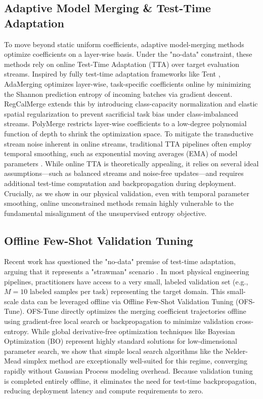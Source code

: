 \subsection{Adaptive Model Merging \& Test-Time Adaptation}
To move beyond static uniform coefficients, adaptive model-merging methods optimize coefficients on a layer-wise basis.
Under the "no-data" constraint, these methods rely on online Test-Time Adaptation (TTA) over target evaluation streams.
Inspired by fully test-time adaptation frameworks like Tent \cite{wang2020tent,liang2023source}, AdaMerging \cite{adamerging} optimizes layer-wise, task-specific coefficients online by minimizing the Shannon prediction entropy of incoming batches via gradient descent.
RegCalMerge \cite{regcalmerge} extends this by introducing class-capacity normalization and elastic spatial regularization to prevent sacrificial task bias under class-imbalanced streams.
PolyMerge \cite{polymerge} restricts layer-wise coefficients to a low-degree polynomial function of depth to shrink the optimization space.
To mitigate the transductive stream noise inherent in online streams, traditional TTA pipelines often employ temporal smoothing, such as exponential moving averages (EMA) of model parameters \cite{wang2020tent}.
While online TTA is theoretically appealing, it relies on several ideal assumptions—such as balanced streams and noise-free updates—and requires additional test-time computation and backpropagation during deployment.
Crucially, as we show in our physical validation, even with temporal parameter smoothing, online unconstrained methods remain highly vulnerable to the fundamental misalignment of the unsupervised entropy objective.

\subsection{Offline Few-Shot Validation Tuning}
Recent work has questioned the "no-data" premise of test-time adaptation, arguing that it represents a "strawman" scenario \cite{liao2021are}.
In most physical engineering pipelines, practitioners have access to a very small, labeled validation set (e.g., $M=10$ labeled samples per task) representing the target domain.
This small-scale data can be leveraged offline via Offline Few-Shot Validation Tuning (OFS-Tune).
OFS-Tune directly optimizes the merging coefficient trajectories offline using gradient-free local search or backpropagation to minimize validation cross-entropy.
While global derivative-free optimization techniques like Bayesian Optimization (BO) represent highly standard solutions for low-dimensional parameter search, we show that simple local search algorithms like the Nelder-Mead simplex method are exceptionally well-suited for this regime, converging rapidly without Gaussian Process modeling overhead.
Because validation tuning is completed entirely offline, it eliminates the need for test-time backpropagation, reducing deployment latency and compute requirements to zero.


